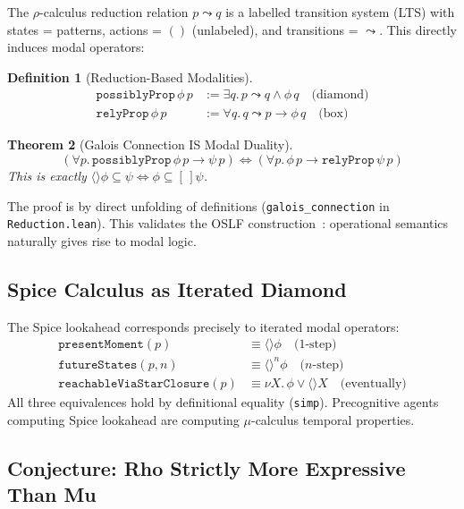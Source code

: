 \documentclass[11pt]{article}
\newtheorem{theorem}{Theorem}[section]
\theoremstyle{definition}
\newtheorem{definition}[theorem]{Definition}
\theoremstyle{remark}
\begin{document}
The $\rho$-calculus reduction relation $p \leadsto q$ is a labelled
transition system (LTS) with
states = patterns, actions = $()$ (unlabeled), and transitions =
$\leadsto$.  This directly induces modal operators:

\begin{definition}[Reduction-Based Modalities]
\begin{align*}
\texttt{possiblyProp}\, \phi\, p &:= \exists q.\, p \leadsto q \land \phi\, q \quad \text{(diamond)} \\
\texttt{relyProp}\, \phi\, p &:= \forall q.\, q \leadsto p \to \phi\, q \quad \text{(box)}
\end{align*}
\end{definition}

\begin{theorem}[Galois Connection IS Modal Duality]
\label{thm:galois}
\[
(\forall p.\, \texttt{possiblyProp}\, \phi\, p \to \psi\, p) \iff
(\forall p.\, \phi\, p \to \texttt{relyProp}\, \psi\, p)
\]
This is exactly $\langle\rangle \phi \subseteq \psi \iff
\phi \subseteq [\,] \psi$.
\end{theorem}

\noindent
The proof is by direct unfolding of definitions
(\texttt{galois\_connection} in \texttt{Reduction.lean}).
This validates the OSLF construction~\cite{MeredithStayOSLF2020,leanOSLF2025}:
operational semantics naturally gives rise to modal logic.

\subsection{Spice Calculus as Iterated Diamond}

The Spice lookahead corresponds precisely to iterated modal operators:
\begin{align*}
  \texttt{presentMoment}(p) &\equiv \langle\rangle \phi \quad \text{(1-step)} \\
  \texttt{futureStates}(p, n) &\equiv \langle\rangle^n \phi \quad \text{($n$-step)} \\
  \texttt{reachableViaStarClosure}(p) &\equiv \nu X.\, \phi \lor \langle\rangle X \quad \text{(eventually)}
\end{align*}
All three equivalences hold by definitional equality (\texttt{simp}).
Precognitive agents computing Spice lookahead are computing
$\mu$-calculus temporal properties.

\subsection{Conjecture: Rho Strictly More Expressive Than Mu}
\label{sec:expressiveness}
\end{document}
